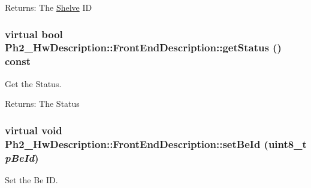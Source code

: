 \begin{Desc}
\item[Returns:]The \hyperlink{class_ph2___hw_description_1_1_shelve}{Shelve} ID \end{Desc}
\hypertarget{class_ph2___hw_description_1_1_front_end_description_867b5c7ff86669819f168cea49539386}{
\subsubsection[getStatus]{\setlength{\rightskip}{0pt plus 5cm}virtual bool Ph2\_\-Hw\-Description::Front\-End\-Description::get\-Status () const}}
\label{class_ph2___hw_description_1_1_front_end_description_867b5c7ff86669819f168cea49539386}


Get the Status. 

\begin{Desc}
\item[Returns:]The Status \end{Desc}
\hypertarget{class_ph2___hw_description_1_1_front_end_description_f123e6401d5e89f4bf6c52cc23911965}{
\subsubsection[setBeId]{\setlength{\rightskip}{0pt plus 5cm}virtual void Ph2\_\-Hw\-Description::Front\-End\-Description::set\-Be\-Id (uint8\_\-t {\em p\-Be\-Id})}}
\label{class_ph2___hw_description_1_1_front_end_description_f123e6401d5e89f4bf6c52cc23911965}


Set the Be ID. 

